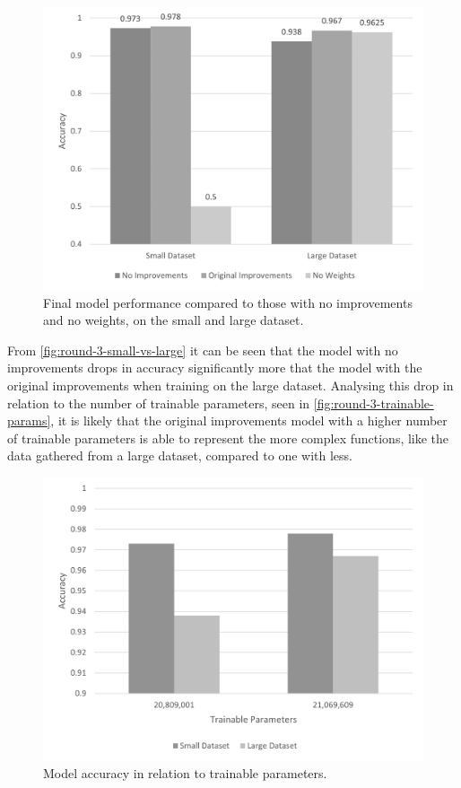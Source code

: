 \begin{figure}[H]
    \centering
    \includegraphics[width=\textwidth]{figures/round-3-small-vs-large.png}
    \caption{Final model performance compared to those with no improvements and no weights, on the small and large dataset.}
    \label{fig:round-3-small-vs-large}
\end{figure}

From \autoref{fig:round-3-small-vs-large} it can be seen that the model with no improvements drops in accuracy significantly more that the model with the original improvements when training on the large dataset. Analysing this drop in relation to the number of trainable parameters, seen in \autoref{fig:round-3-trainable-params}, it is likely that the original improvements model with a higher number of trainable parameters is able to represent the more complex functions, like the data gathered from a large dataset, compared to one with less.

\begin{figure}[H]
    \centering
    \includegraphics[width=\textwidth]{figures/round-3-trainable-params.png}
    \caption{Model accuracy in relation to trainable parameters.}
    \label{fig:round-3-trainable-params}
\end{figure}

